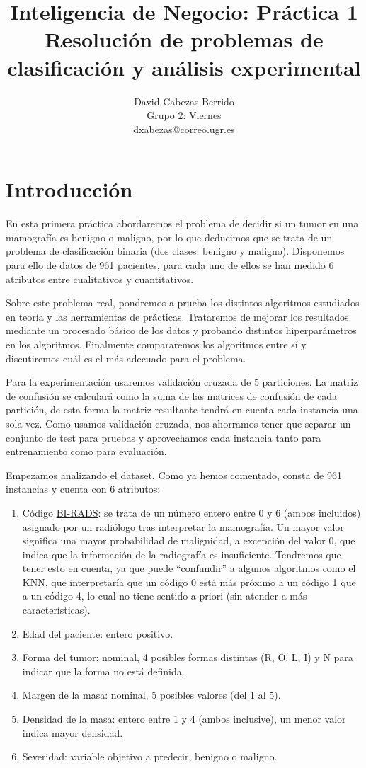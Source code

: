 \documentclass{article}
\title{\Huge Inteligencia de Negocio: Práctica 1 \\ Resolución de problemas
  de clasificación y análisis experimental\vspace{10mm}}
\author{\huge David Cabezas Berrido \vspace{10mm} \\ 
  \huge Grupo 2: Viernes \vspace{10mm} \\ \huge dxabezas@correo.ugr.es \vspace{10mm}}
\begin{document}
\maketitle
\newpage
\tableofcontents
\newpage

\section{Introducción}

En esta primera práctica abordaremos el problema de decidir si un
tumor en una mamografía es benigno o maligno, por lo que deducimos que
se trata de un problema de clasificación binaria (dos clases: benigno
y maligno). Disponemos para ello de datos de 961 pacientes, para cada
uno de ellos se han medido 6 atributos entre cualitativos y
cuantitativos.

Sobre este problema real, pondremos a prueba los distintos algoritmos
estudiados en teoría y las herramientas de prácticas. Trataremos de
mejorar los resultados mediante un procesado básico de los datos y
probando distintos hiperparámetros en los algoritmos. Finalmente
compararemos los algoritmos entre sí y discutiremos cuál es el más
adecuado para el problema.

Para la experimentación usaremos validación cruzada de 5
particiones. La matriz de confusión se calculará como la suma de las
matrices de confusión de cada partición, de esta forma la matriz
resultante tendrá en cuenta cada instancia una sola vez. Como usamos
validación cruzada, nos ahorramos tener que separar un conjunto de
test para pruebas y aprovechamos cada instancia tanto para
entrenamiento como para evaluación.

Empezamos analizando el dataset. Como ya hemos comentado, consta de
961 instancias y cuenta con 6 atributos: 

\begin{enumerate}
\item Código \href{https://es.wikipedia.org/wiki/BI-RADS}{BI-RADS}: se
  trata de un número entero entre 0 y 6 (ambos incluidos) asignado por
  un radiólogo tras interpretar la mamografía. Un mayor valor
  significa una mayor probabilidad de malignidad, a excepción del
  valor 0, que indica que la información de la radiografía es
  insuficiente. Tendremos que tener esto en cuenta, ya que puede
  ``confundir'' a algunos algoritmos como el KNN, que interpretaría
  que un código 0 está más próximo a un código 1 que a un código 4, lo
  cual no tiene sentido a priori (sin atender a más características).

\item Edad del paciente: entero positivo.
\item Forma del tumor: nominal, 4 posibles formas distintas (R, O, L,
  I) y N para indicar que la forma no está definida.
\item Margen de la masa: nominal, 5 posibles valores (del 1 al 5).
\item Densidad de la masa: entero entre 1 y 4 (ambos inclusive), un
  menor valor indica mayor densidad.
\item Severidad: variable objetivo a predecir, benigno o maligno. 
\end{enumerate}
\end{document}
